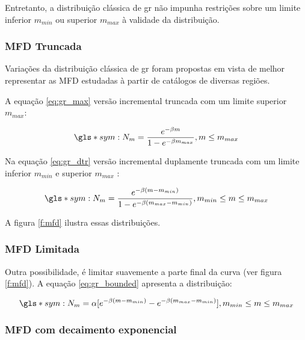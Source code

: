 Entretanto, a distribuição clássica de \gls{gr} não impunha restrições sobre um limite inferior $m_{min}$ 
ou superior $m_{max}$ à validade da distribuição.



\subsubsection{MFD Truncada}
\label{sec:TMFD}

Variações da distribuição clássica de \gls{gr} foram propostas em vista de melhor representar as MFD estudadas à partir de
catálogos de diversas regiões.

A equação \ref{eq:gr_max} versão incremental truncada com um limite superior $m_{max}$:

\begin{equation}
		\gls*{sym:N_m} = \frac{e^{-\beta m}}{1 -e^{-\beta m_{max}} }, m \leq m_{max}
	\label{eq:gr_max}
\end{equation}

Na equação \ref{eq:gr_dtr} versão incremental duplamente truncada com um limite inferior $m_{min}$ e superior $m_{max}$ :

\begin{equation}
		\gls*{sym:N_m} = \frac{e^{-\beta (m - m_{min})}}{1 -e^{-\beta (m_{max} - m_{min}) } } , m_{min} \leq m \leq m_{max}
	\label{eq:gr_dtr}
\end{equation}

A figura \ref{f:mfd} ilustra essas distribuições.

\subsubsection{MFD Limitada}
\label{sec:BMFD}

Outra possibilidade, é limitar suavemente a parte final da curva (ver figura \ref{f:mfd}). A equação \ref{eq:gr_bounded} apresenta
a distribuição:

\begin{equation}
		\gls*{sym:N_m} = \alpha [ e^{-\beta (m - m_{min})} - e^{-\beta (m_{max} - m_{min}) } ], m_{min} \leq m \leq m_{max}
	\label{eq:gr_bounded}
\end{equation}


\subsubsection{MFD com decaimento exponencial}
\label{sec:KMFD}

